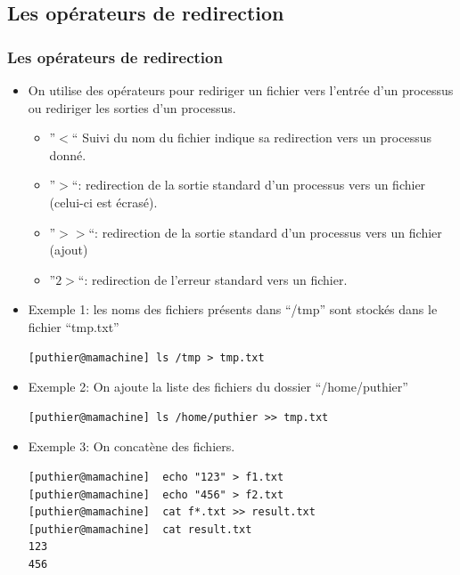 \documentclass[10pt, xcolor=dvipsnames]{beamer}
\begin{document}
\subsection{Les opérateurs de redirection}

\begin{frame}[fragile]
\frametitle{Les opérateurs de redirection}
            \begin{itemize}
          \item On utilise des opérateurs pour rediriger un fichier vers l'entrée d'un processus ou rediriger les sorties d'un processus.
                  \begin{itemize}
                        \item ''$<$`` Suivi du nom du fichier indique sa redirection vers un processus donné.
                        \item ''$>$``: redirection de la sortie standard d'un processus vers un fichier (celui-ci est écrasé).
                        \item ''$>>$``: redirection de la sortie standard d'un processus vers un fichier (ajout)
                        \item ''$2>$``: redirection de l'erreur standard vers un fichier.
                \end{itemize}
      \end{itemize}
\end{frame}

\begin{frame}[fragile]
            \begin{itemize}
          \item Exemple 1: les noms des fichiers présents dans ``/tmp'' sont stockés dans le fichier ``tmp.txt''
             \begin{verbatim}
[puthier@mamachine] ls /tmp > tmp.txt
             \end{verbatim}
          \item Exemple 2: On ajoute la liste des fichiers du dossier ``/home/puthier''
             \begin{verbatim}
[puthier@mamachine] ls /home/puthier >> tmp.txt
             \end{verbatim}
          \item Exemple 3: On concatène des fichiers. 
\begin{small}
             \begin{verbatim}
[puthier@mamachine]  echo "123" > f1.txt
[puthier@mamachine]  echo "456" > f2.txt
[puthier@mamachine]  cat f*.txt >> result.txt
[puthier@mamachine]  cat result.txt
123
456
            \end{verbatim}          
\end{small}
      \end{itemize}
\end{frame}
\end{document}
